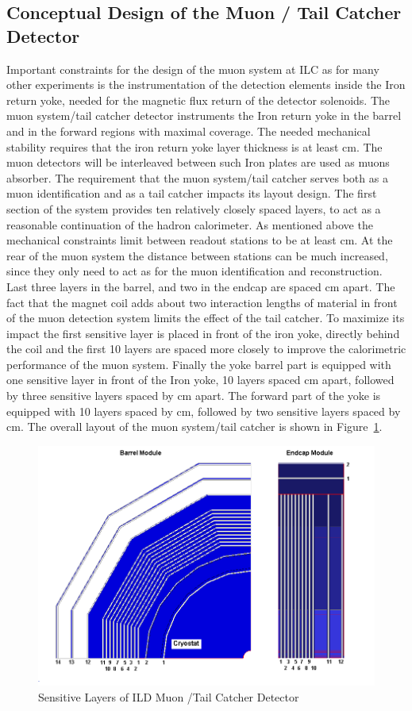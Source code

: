 \subsection{Conceptual Design of the Muon / Tail Catcher Detector}
Important constraints for the design of the muon system at ILC  as for many other experiments is the instrumentation of the detection elements inside the Iron return yoke, needed for the magnetic flux return of the detector solenoids.
The muon system/tail catcher detector instruments the Iron return yoke in the barrel and in the forward regions with maximal coverage.
The needed mechanical stability requires that the iron return yoke layer thickness is at least \unit[10]{cm}. The muon detectors will be interleaved between such Iron plates are used as muons absorber.
The requirement that the muon system/tail catcher serves both as a muon identification and as a tail catcher impacts its layout design.
The first section of the system provides ten relatively closely spaced layers, to act as a reasonable continuation of the hadron calorimeter.
As mentioned above the mechanical constraints limit between readout stations to be at least \unit[10]{cm}.
At the rear of the muon system the distance between stations can be much increased, since they only need to act as for the  muon identification and reconstruction.
Last three layers in the barrel, and two in the endcap are spaced \unit[60]{cm} apart.
The fact that the magnet coil adds about two interaction lengths of material in front of the muon detection system limits the effect of the tail catcher.
To maximize its impact the first sensitive layer is placed in front of the iron yoke, directly behind the coil and the first 10 layers are spaced more closely
to improve the calorimetric performance of the muon system.
Finally the yoke barrel part is equipped with one sensitive layer in front of the Iron yoke, 10 layers spaced \unit[14]{cm} apart, followed by three sensitive layers spaced by \unit[60]{cm} apart. The forward part of the yoke is equipped with 10 layers spaced by \unit[14]{cm}, followed by two sensitive layers spaced by \unit[60]{cm}. The overall layout of the muon system/tail catcher is shown in Figure~\ref{fig:ild:muon:concept}.
\begin{figure}
	\centering
\includegraphics[height=8cm]{MuonDetector/MuonDetectorILD/2D_barel_endcap.png}
	\caption{Sensitive Layers of ILD Muon /Tail Catcher Detector}
	\label{fig:ild:muon:concept}
\end{figure}

